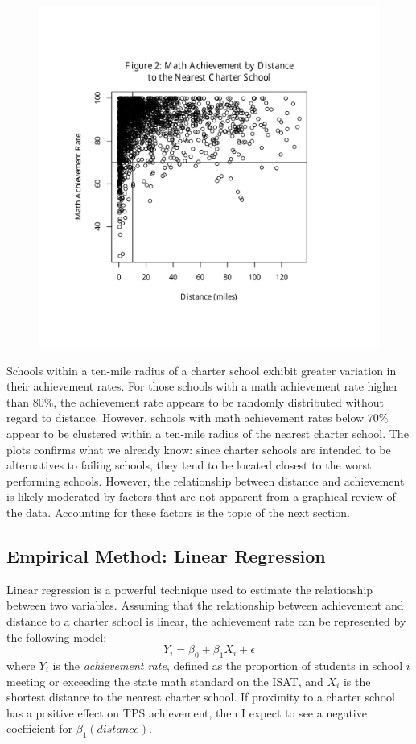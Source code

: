 \documentclass[11pt]{article}
\begin{document}
\begin{figure}[H]
\centering
    \includegraphics[trim= 0in 0.75in 0in 1in,clip,scale=0.8]{math_rate_dist}
\end{figure}

Schools within a ten-mile radius of a charter school exhibit greater variation in their achievement rates.  For those schools with a math achievement rate higher than 80\%, the achievement rate appears to be randomly distributed without regard to distance.  However, schools with math achievement rates below 70\% appear to be clustered within a ten-mile radius of the nearest charter school.  The plots confirms what we already know: since charter schools are intended to be alternatives to failing schools, they tend to be located closest to the worst performing schools.  However, the relationship between distance and achievement is likely moderated by factors that are not apparent from a graphical review of the data.  Accounting for these factors is the topic of the next section.

\subsection{Empirical Method: Linear Regression}
Linear regression is a powerful technique used to estimate the relationship between two variables.  Assuming that the relationship between achievement and distance to a charter school is linear, the achievement rate can be represented by the following model:
\begin{equation*}
Y_i=\beta_0+\beta_1X_i+\epsilon
\end{equation*}
where $Y_i$ is the \textit{achievement rate}, defined as the proportion of students in school $i$ meeting or exceeding the state math standard on the ISAT, and $X_i$ is the shortest distance to the nearest charter school.  If proximity to a charter school has a positive effect on TPS achievement, then I expect to see a negative coefficient for $\beta_1(distance)$.
\end{document}
